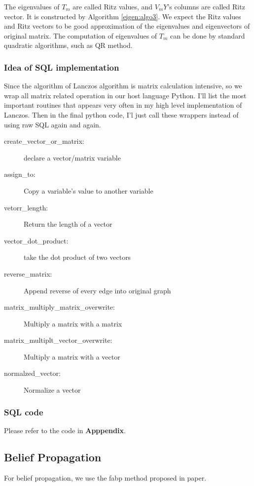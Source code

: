 The eigenvalues of $T_{m}$ are called Ritz values, and $V_{m}Y$'s columns are called Ritz vector. It is constructed by Algorithm \ref{eigen:algo3}. We expect the Ritz values and Ritz vectors to be good approximation of the eigenvalues and eigenvectors of original matrix. The computation of eigenvalues of $T_{m}$ can be done by standard quadratic algorithms, such as QR method. 


\subsubsection{Idea of SQL implementation}
Since the algorithm of Lanczos algorithm is matrix calculation intensive, so we wrap all matrix related operation in our host language Python. I'll list the most important routines that appears very often in my high level implementation of Lanczos. Then in the final python code, I'l just call these wrappers instead of using raw SQL again and again.
\begin{description}
  \item[create\_vector\_or\_matrix:]{declare a vector/matrix variable}
  \item[assign\_to:]{Copy a variable's value to another variable}
  \item[vetorr\_length:]{Return the length of a vector}
  \item[vector\_dot\_product:]{take the dot product of two vectors}
  \item[reverse\_matrix:]{Append reverse of every edge into original graph}
  \item[matrix\_multiply\_matrix\_overwrite:]{Multiply a matrix with a matrix}
  \item[matrix\_multiplt\_vector\_overwrite:]{Multiply a matrix with a vector}
  \item[normalzed\_vector:]{Normalize a vector}
\end{description}

\subsubsection{SQL code}
Please refer to the code in {\bf Apppendix}.

\subsection{Belief Propagation}
For belief propagation, we use the fabp method proposed in paper\cite{DBLP:conf/pkdd/KoutraKKCPF11}.

